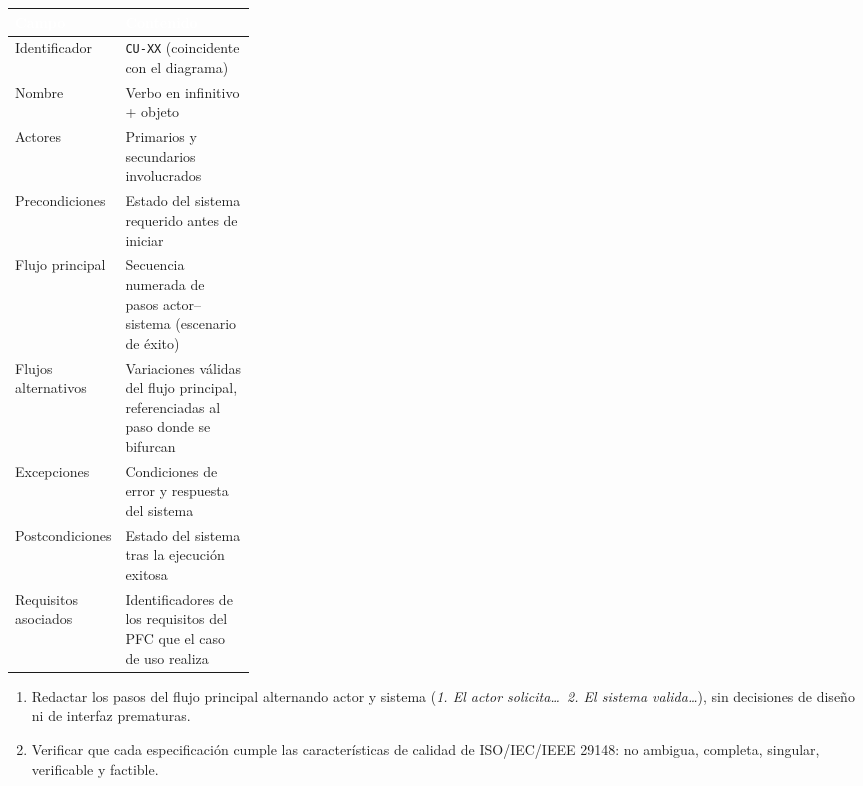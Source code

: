 \documentclass[11pt]{article}
\newcommand{\bhdr}[1]{\cellcolor{midblue}\textcolor{white}{\textbf{#1}}}
\begin{document}
\noindent\begin{tabularx}{\linewidth}{|L{0.28\linewidth}|X|}
\hline
\bhdr{Campo} & \bhdr{Contenido}\\
\hline
Identificador & \texttt{CU-XX} (coincidente con el diagrama)\\
\hline
{}Nombre & Verbo en infinitivo + objeto\\
\hline
Actores & Primarios y secundarios involucrados\\
\hline
{}Precondiciones & Estado del sistema requerido antes de iniciar\\
\hline
Flujo principal & Secuencia numerada de pasos actor--sistema (escenario de éxito)\\
\hline
{}Flujos alternativos & Variaciones válidas del flujo principal, referenciadas al paso donde se bifurcan\\
\hline
Excepciones & Condiciones de error y respuesta del sistema\\
\hline
{}Postcondiciones & Estado del sistema tras la ejecución exitosa\\
\hline
Requisitos asociados & Identificadores de los requisitos del PFC que el caso de uso realiza\\
\hline
\end{tabularx}

\begin{enumerate}[leftmargin=18pt,itemsep=2pt,resume]
  \item Redactar los pasos del flujo principal alternando actor y sistema (\textit{1. El actor solicita\ldots\ 2. El sistema valida\ldots}), sin decisiones de diseño ni de interfaz prematuras.
  \item Verificar que cada especificación cumple las características de calidad de ISO/IEC/IEEE 29148: no ambigua, completa, singular, verificable y factible.
\end{enumerate}
\end{document}
